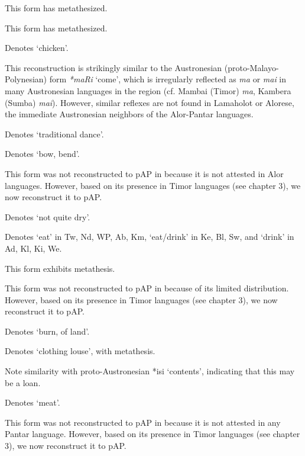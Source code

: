 {\tablenotetext}{This form has metathesized. }

{\tablenotetext}{This form has metathesized. }

{\tablenotetext}{Denotes `chicken'.}

{\tablenotetext}{This reconstruction is strikingly similar to the Austronesian (proto-Malayo-Polynesian) form \textit{*maRi} `come', which is irregularly reflected as \textit{ma} or \textit{mai }in many Austronesian languages in the region (cf. Mambai (Timor) \textit{ma}, Kambera (Sumba) \textit{mai}). However, similar reflexes are not found in Lamaholot or Alorese, the immediate Austronesian neighbors of the Alor-Pantar languages.}

{\tablenotetext}{Denotes `traditional dance'.}

{\tablenotetext}{Denotes `bow, bend'.}

{\tablenotetext}{This form was not reconstructed to pAP in \citep{HoltonEtAl2012} because it is not attested in Alor languages. However, based on its presence in Timor languages (see chapter 3), we now reconstruct it to pAP.}

{\tablenotetext}{Denotes `not quite dry'.}

{\tablenotetext}{Denotes `eat' in Tw, Nd, WP, Ab, Km, `eat/drink' in Ke, Bl, Sw, and `drink' in Ad, Kl, Ki, We.}

{\tablenotetext}{This form exhibits metathesis. }

{\tablenotetext}{This form was not reconstructed to pAP in \citep{HoltonEtAl2012} because of its limited distribution. However, based on its presence in Timor languages (see chapter 3), we now reconstruct it to pAP.}

{\tablenotetext}{Denotes `burn, of land'.}

{\tablenotetext}{Denotes `clothing louse', with metathesis. }

{\tablenotetext}{Note similarity with proto-Austronesian *isi{\textglotstop} `contents', indicating that this may be a loan.}

{\tablenotetext}{Denotes `meat'.}

{\tablenotetext}{This form was not reconstructed to pAP in \citep{HoltonEtAl2012} because it is not attested in any Pantar language. However, based on its presence in Timor languages (see chapter 3), we now reconstruct it to pAP.}

